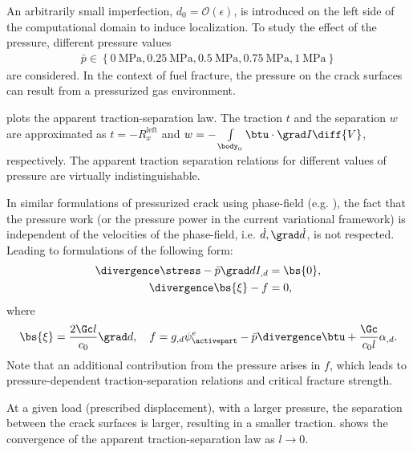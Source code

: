 An arbitrarily small imperfection, $d_0 = \mathcal{O}(\epsilon)$, is introduced on the left side of the computational domain to induce localization.
To study the effect of the pressure, different pressure values
\begin{align*}
  \bar{p} \in \left\{ \SI{0}{\mega\pascal}, \SI{0.25}{\mega\pascal}, \SI{0.5}{\mega\pascal}, \SI{0.75}{\mega\pascal}, \SI{1}{\mega\pascal} \right\}
\end{align*}
are considered. In the context of fuel fracture, the pressure on the crack surfaces can result from a pressurized gas environment.



 plots the apparent traction-separation law. The traction $t$ and the separation $w$ are approximated as $t = -R_x^\text{left}$ and $w = - \int\limits_{\body_0} \btu \cdot \grad I \diff{V}$, respectively. The apparent traction separation relations for different values of pressure are virtually indistinguishable.
\begin{remark}
  In similar formulations of pressurized crack using phase-field (e.g. \cite{CHUKWUDOZIE2019957,Mikeli__2015,WILSON2016264}), the fact that the pressure work (or the pressure power in the current variational framework) is independent of the velocities of the phase-field, i.e. $\dot{d}, \grad \dot{d}$, is not respected. Leading to formulations of the following form:
  \begin{subequations}
    \begin{align}
      \divergence \stress - \bar{p} \grad d I_{,d} & = \bs{0}, \\
      \divergence \bs{\xi} - f                     & = 0,      
    \end{align}
  \end{subequations}
  where
  \begin{align}
    \bs{\xi} = \dfrac{2\Gc l}{c_0} \grad d, \quad f = g_{,d}\psi^e_\activepart - \bar{p}\divergence\btu + \dfrac{\Gc}{c_0l}\alpha_{,d}.
  \end{align}
  Note that an additional contribution from the pressure arises in $f$, which leads to pressure-dependent traction-separation relations and critical fracture strength.
\end{remark}
At a given load (prescribed displacement), with a larger pressure, the separation between the crack surfaces is larger, resulting in a smaller traction.  shows the convergence of the apparent traction-separation law as $l \to 0$.

